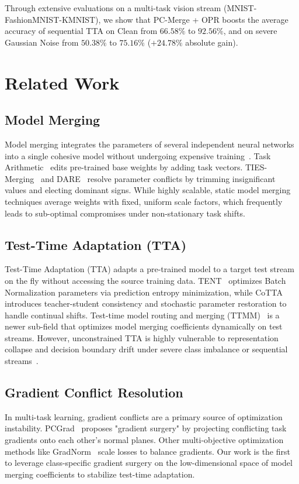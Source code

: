 \documentclass{article}
\theoremstyle{plain}
\theoremstyle{definition}
\theoremstyle{remark}
\begin{document}
Through extensive evaluations on a multi-task vision stream (MNIST-FashionMNIST-KMNIST), we show that PC-Merge + OPR boosts the average accuracy of sequential TTA on Clean from $66.58\%$ to $\mathbf{92.56\%}$, and on severe Gaussian Noise from $50.38\%$ to $\mathbf{75.16\%}$ ($+24.78\%$ absolute gain).

\section{Related Work}
\label{sec:related}

\subsection{Model Merging}
Model merging integrates the parameters of several independent neural networks into a single cohesive model without undergoing expensive training~\cite{wortsman2022robust, matena2021merging}. Task Arithmetic~\cite{ilharco2022editing} edits pre-trained base weights by adding task vectors. TIES-Merging~\cite{yadav2023resolving} and DARE~\cite{yu2024dare} resolve parameter conflicts by trimming insignificant values and electing dominant signs. While highly scalable, static model merging techniques average weights with fixed, uniform scale factors, which frequently leads to sub-optimal compromises under non-stationary task shifts.

\subsection{Test-Time Adaptation (TTA)}
Test-Time Adaptation (TTA) adapts a pre-trained model to a target test stream on the fly without accessing the source training data. TENT~\cite{wang2021tent} optimizes Batch Normalization parameters via prediction entropy minimization, while CoTTA~\cite{wang2022continual} introduces teacher-student consistency and stochastic parameter restoration to handle continual shifts. Test-time model routing and merging (TTMM)~\cite{zhao2024dynamic, li2024test} is a newer sub-field that optimizes model merging coefficients dynamically on test streams. However, unconstrained TTA is highly vulnerable to representation collapse and decision boundary drift under severe class imbalance or sequential streams~\cite{dobler2022robust, shao2023test}.

\subsection{Gradient Conflict Resolution}
In multi-task learning, gradient conflicts are a primary source of optimization instability. PCGrad~\cite{yu2020gradient} proposes "gradient surgery" by projecting conflicting task gradients onto each other's normal planes. Other multi-objective optimization methods like GradNorm~\cite{chen2018gradnorm} scale losses to balance gradients. Our work is the first to leverage class-specific gradient surgery on the low-dimensional space of model merging coefficients to stabilize test-time adaptation.
\end{document}
